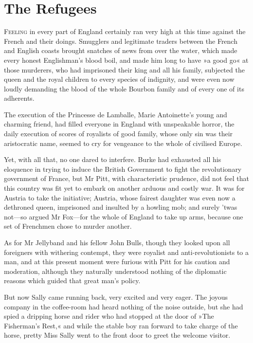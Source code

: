 
\chapter{The Refugees}
\lettrine[lines=4]{F}{eeling} in every part of England certainly ran very high at this time against the French and their doings. Smugglers and legitimate traders between the French and English coasts brought snatches of news from over the water, which made every honest Englishman's blood boil, and made him long to have »a good go« at those murderers, who had imprisoned their king and all his family, subjected the queen and the royal children to every species of indignity, and were even now loudly demanding the blood of the whole Bourbon family and of every one of its adherents.

The execution of the Princesse de Lamballe, Marie Antoinette's young and charming friend, had filled everyone in England with unspeakable horror, the daily execution of scores of royalists of good family, whose only sin was their aristocratic name, seemed to cry for vengeance to the whole of civilised Europe.

Yet, with all that, no one dared to interfere. Burke had exhausted all his eloquence in trying to induce the British Government to fight the revolutionary government of France, but Mr Pitt, with characteristic prudence, did not feel that this country was fit yet to embark on another arduous and costly war. It was for Austria to take the initiative; Austria, whose fairest daughter was even now a dethroned queen, imprisoned and insulted by a howling mob; and surely 'twas not\allowbreak---\allowbreak so argued Mr Fox\allowbreak---\allowbreak for the whole of England to take up arms, because one set of Frenchmen chose to murder another.

As for Mr Jellyband and his fellow John Bulls, though they looked upon all foreigners with withering contempt, they were royalist and anti-revolutionists to a man, and at this present moment were furious with Pitt for his caution and moderation, although they naturally understood nothing of the diplomatic reasons which guided that great man's policy.

But now Sally came running back, very excited and very eager. The joyous company in the coffee-room had heard nothing of the noise outside, but she had spied a dripping horse and rider who had stopped at the door of »The Fisherman's Rest,« and while the stable boy ran forward to take charge of the horse, pretty Miss Sally went to the front door to greet the welcome visitor.

